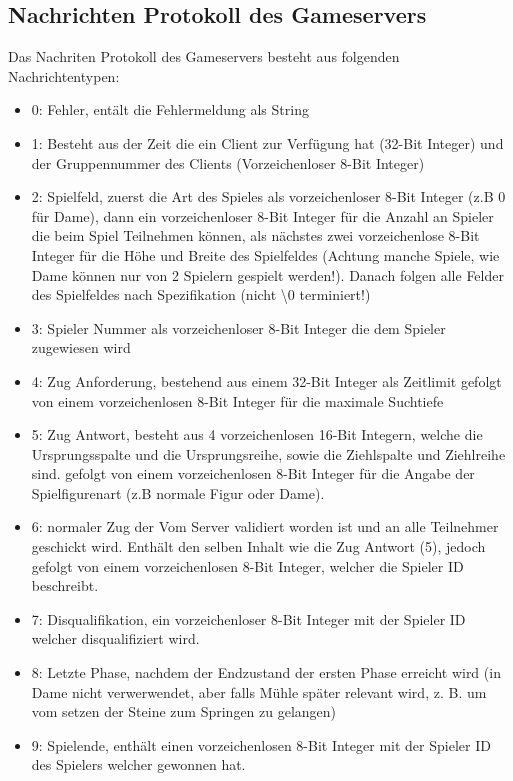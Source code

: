 \documentclass[12pt,a4paper,bibliography=totocnumbered,listof=totocnumbered]{article}
\begin{document}
\begin{appendix}
\pagebreak

\section{Nachrichten Protokoll des Gameservers}
\label{apx:Protokoll}
Das Nachriten Protokoll des Gameservers besteht aus folgenden Nachrichtentypen:
\begin{itemize}
    \item 0: Fehler, entält die Fehlermeldung als String
    \item 1: Besteht aus der Zeit die ein Client zur Verfügung hat (32-Bit Integer) und der Gruppennummer des Clients (Vorzeichenloser 8-Bit Integer)
    \item 2: Spielfeld, zuerst die Art des Spieles als vorzeichenloser 8-Bit Integer (z.B 0 für Dame), dann ein vorzeichenloser 8-Bit Integer für die Anzahl an Spieler die 
    beim Spiel Teilnehmen können, als nächstes zwei vorzeichenlose 8-Bit Integer für die Höhe und Breite des Spielfeldes 
    (Achtung manche Spiele, wie Dame können nur von 2 Spielern gespielt werden!).
    Danach folgen alle Felder des Spielfeldes nach Spezifikation (nicht \textbackslash0 terminiert!)
    \item 3: Spieler Nummer als vorzeichenloser 8-Bit Integer die dem Spieler zugewiesen wird
    \item 4: Zug Anforderung, bestehend aus einem 32-Bit Integer als Zeitlimit gefolgt von einem vorzeichenlosen 8-Bit Integer für die maximale Suchtiefe
    \item 5: Zug Antwort, besteht aus 4 vorzeichenlosen 16-Bit Integern, welche die Ursprungsspalte und die Ursprungsreihe, sowie die Ziehlspalte und Ziehlreihe sind.
    gefolgt von einem vorzeichenlosen 8-Bit Integer für die Angabe der Spielfigurenart (z.B normale Figur oder Dame).
    \item 6: normaler Zug der Vom Server validiert worden ist und an alle Teilnehmer geschickt wird. Enthält den selben Inhalt wie die Zug Antwort (5), jedoch 
    gefolgt von einem vorzeichenlosen 8-Bit Integer, welcher die Spieler ID beschreibt.
    \item 7: Disqualifikation, ein vorzeichenloser 8-Bit Integer mit der Spieler ID welcher disqualifiziert wird.
    \item 8: Letzte Phase, nachdem der Endzustand der ersten Phase erreicht wird (in Dame nicht verwerwendet, aber falls Mühle später relevant wird, z. B. um vom setzen 
    der Steine zum Springen zu gelangen)
    \item 9: Spielende, enthält einen vorzeichenlosen 8-Bit Integer mit der Spieler ID des Spielers welcher gewonnen hat.
\end{itemize}


\end{appendix}
\end{document}
